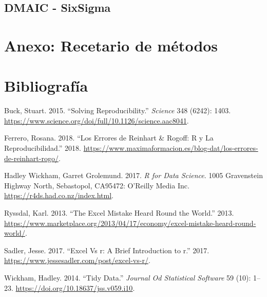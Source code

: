 \documentclass[
  letterpaper,
]{scrbook}
\newlength{\cslhangindent}
\newlength{\cslentryspacingunit} %
\newenvironment{CSLReferences}[2] %
 {%
  \setlength{\parindent}{0pt}
  \ifodd #1
  \let\oldpar\par
  \def\par{\hangindent=\cslhangindent\oldpar}
  \fi
  \setlength{\parskip}{#2\cslentryspacingunit}
 }%
 {}
\begin{document}
\hypertarget{dmaic---sixsigma}{%
\section{DMAIC - SixSigma}\label{dmaic---sixsigma}}


\hypertarget{anexo-recetario-de-muxe9todos}{%
\chapter{Anexo: Recetario de
métodos}\label{anexo-recetario-de-muxe9todos}}


\hypertarget{bibliografuxeda}{%
\chapter*{Bibliografía}\label{bibliografuxeda}}

\hypertarget{refs}{}
\begin{CSLReferences}{1}{0}
\leavevmode{}%
Buck, Stuart. 2015. {``Solving Reproducibility.''} \emph{Science} 348
(6242): 1403.
\url{https://www.science.org/doi/full/10.1126/science.aac8041}.

\leavevmode{}%
Ferrero, Rosana. 2018. {``Los Errores de Reinhart \& Rogoff: R y La
Reproducibilidad.''} 2018.
\url{https://www.maximaformacion.es/blog-dat/los-errores-de-reinhart-rogo/}.

\leavevmode{}%
Hadley Wickham, Garret Grolemund. 2017. \emph{R for Data Science}. 1005
Gravenstein Highway North, Sebastopol, CA95472: O'Reilly Media Inc.
\url{https://r4ds.had.co.nz/index.html}.

\leavevmode{}%
Ryssdal, Karl. 2013. {``The Excel Mistake Heard Round the World.''}
2013.
\url{https://www.marketplace.org/2013/04/17/economy/excel-mistake-heard-round-world/}.

\leavevmode{}%
Sadler, Jesse. 2017. {``Excel Vs r: A Brief Introduction to r.''} 2017.
\url{https://www.jessesadler.com/post/excel-vs-r/}.

\leavevmode{}%
Wickham, Hadley. 2014. {``Tidy Data.''} \emph{Journal Od Statistical
Software} 59 (10): 1--23. \url{https://doi.org/10.18637/jss.v059.i10}.

\end{CSLReferences}


\backmatter
\end{document}
